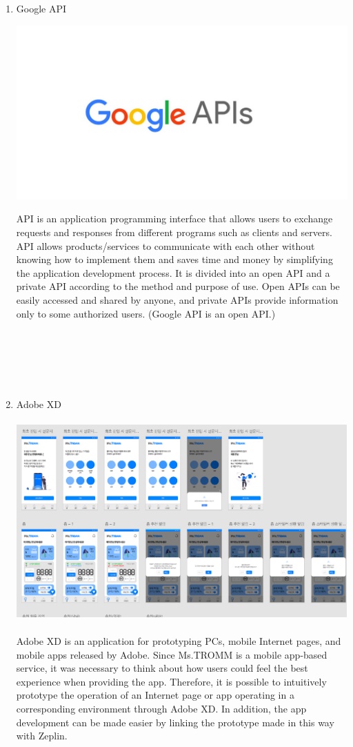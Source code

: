 \documentclass[conference]{IEEEtran}
\begin{document}
\begin{enumerate}
 \break
    
    \item Google API \\ 
    \centerline{\includegraphics[scale=0.3]{assets/googleapi.jpg}}
    API is an application programming interface that allows users to exchange requests and responses from different programs such as clients and servers. API allows products/services to communicate with each other without knowing how to implement them and saves time and money by simplifying the application development process. It is divided into an open API and a private API according to the method and purpose of use. Open APIs can be easily accessed and shared by anyone, and private APIs provide information only to some authorized users. (Google API is an open API.) \\ \\ \\ \\ \\ \\
 
    \item Adobe XD \\ \\
    \includegraphics[scale=0.9]{assets/XD.png}
     \\ \\Adobe XD is an application for prototyping PCs, mobile Internet pages, and mobile apps released by Adobe. Since Ms.TROMM is a mobile app-based service, it was necessary to think about how users could feel the best experience when providing the app. Therefore, it is possible to intuitively prototype the operation of an Internet page or app operating in a corresponding environment through Adobe XD. In addition, the app development can be made easier by linking the prototype made in this way with Zeplin.


\end{enumerate}
\end{document}
